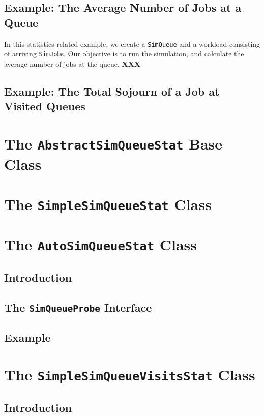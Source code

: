 \documentclass[12pt]{book}
\begin{document}
\subsection{Example: The Average Number of Jobs at a Queue}

In this statistics-related example,
  we create a \lstinline|SimQueue| and
  a workload consisting of arriving \lstinline|SimJob|s.
Our objective is to run the simulation,
  and calculate the average number of jobs at the queue.
{\bf XXX}

\subsection{Example: The Total Sojourn of a Job at Visited Queues}

\section{The \lstinline|AbstractSimQueueStat| Base Class}

\section{The \lstinline|SimpleSimQueueStat| Class}

\section{The \lstinline|AutoSimQueueStat| Class}

\subsection{Introduction}

\subsection{The \lstinline|SimQueueProbe| Interface}

\subsection{Example}

\section{The \lstinline|SimpleSimQueueVisitsStat| Class}

\subsection{Introduction}
\end{document}
